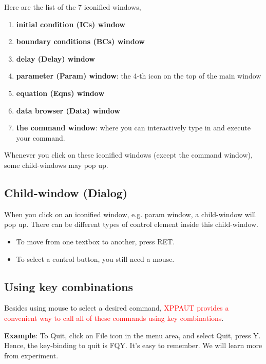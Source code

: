 Here are the list of the 7 iconified windows,
\begin{enumerate}
\item {\bf initial condition (ICs) window}

\item {\bf boundary conditions (BCs) window}

\item {\bf delay (Delay) window}

\item {\bf parameter (Param) window}: the 4-th icon on the top of the
  main window

\item {\bf equation (Eqns) window}

\item {\bf data browser (Data) window}

\item {\bf the command window}: where you can interactively type in
  and execute your command.
\end{enumerate}
Whenever you click on these iconified windows (except the command
window), some child-windows may pop up.

\subsection{Child-window (Dialog)}
\label{sec:dialog}

When you click on an iconified window, e.g. param window, a
child-window will pop up. There can be different types of control
element inside this child-window.

\begin{itemize}
\item To move from one textbox to another, press RET.
\item To select a control button, you still need a mouse.
\end{itemize}

\subsection{Using key combinations}
\label{sec:using-key-comb}


Besides using mouse to select a desired command,
\textcolor{red}{XPPAUT provides a convenient way to call all of these
  commands using key combinations}.

{\bf Example}: To Quit, click on File icon in the menu area, and select
Quit, press Y.  Hence, the key-binding to quit is FQY. It's easy to
remember. We will learn more from experiment.

